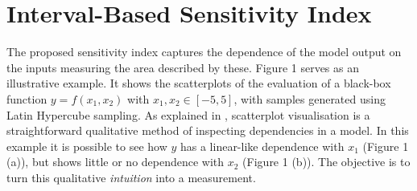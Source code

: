 \documentclass[twocolumn]{rps-esrel2022}
\begin{document}
\section{Interval-Based Sensitivity Index}

The proposed sensitivity index captures the dependence of the model output on the inputs measuring the area described by these.
Figure 1 serves as an illustrative example.
It shows the scatterplots of the evaluation of a black-box function $y = f(x_1,x_2)$ with $x_1,x_2 \in [-5,5]$, with samples generated using Latin Hypercube sampling.
As explained in \cite{helton2003latin}, scatterplot visualisation is a straightforward qualitative method of inspecting dependencies in a model.
In this example it is possible to see how $y$ has a linear-like dependence with $x_1$ (Figure 1 (a)), but shows little or no dependence with $x_2$ (Figure 1 (b)).
The objective is to turn this qualitative \textit{intuition} into a measurement.
\end{document}
